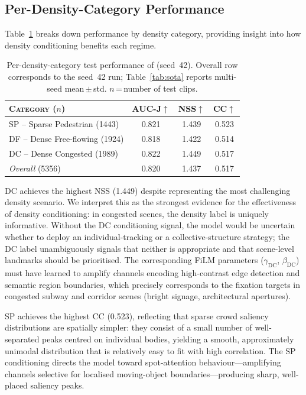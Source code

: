 \documentclass[twocolumn]{article}
\begin{document}
\subsection{Per-Density-Category Performance}
\label{sec:per_cat}

Table~\ref{tab:per_cat} breaks down \ourmodel{} performance by density
category, providing insight into how density conditioning benefits each
regime.

\begin{table}[!t]
  \def\arraystretch{1.1}
  \centering
  \footnotesize
  \caption{%
    Per-density-category test performance of \ourmodel{} (seed~42).
    Overall row corresponds to the seed~42 run; Table~\ref{tab:sota}
    reports multi-seed mean\,$\pm$\,std.
    $n$\,=\,number of test clips.
  }
  \begin{tabular}{lccc}
    \toprule
    \textsc{Category} ($n$)
      & \textsc{AUC-J}$\uparrow$
      & \textsc{NSS}$\uparrow$
      & \textsc{CC}$\uparrow$ \\
    \midrule
    SP -- Sparse Pedestrian (1443)  & 0.821 & 1.439 & 0.523 \\
    DF -- Dense Free-flowing (1924) & 0.818 & 1.422 & 0.514 \\
    DC -- Dense Congested (1989)    & 0.822 & 1.449 & 0.517 \\
    \midrule
    \textit{Overall} (5356)         & 0.820 & 1.437 & 0.517 \\
    \bottomrule
  \end{tabular}
  \label{tab:per_cat}
\end{table}

DC achieves the highest NSS (1.449) despite representing the most
challenging density scenario.  We interpret this as the strongest evidence
for the effectiveness of density conditioning: in congested scenes, the
density label is uniquely informative.  Without the DC conditioning signal,
the model would be uncertain whether to deploy an individual-tracking or
a collective-structure strategy; the DC label unambiguously signals that
neither is appropriate and that scene-level landmarks should be prioritised.
The corresponding FiLM parameters ($\gamma_\mathrm{DC}$, $\beta_\mathrm{DC}$)
must have learned to amplify channels encoding high-contrast edge detection
and semantic region boundaries, which precisely corresponds to the fixation
targets in congested subway and corridor scenes (bright signage, architectural
apertures).

SP achieves the highest CC (0.523), reflecting that sparse crowd saliency
distributions are spatially simpler: they consist of a small number of
well-separated peaks centred on individual bodies, yielding a smooth,
approximately unimodal distribution that is relatively easy to fit with
high correlation.  The SP conditioning directs the model toward
spot-attention behaviour---amplifying channels selective for localised
moving-object boundaries---producing sharp, well-placed saliency peaks.
\end{document}
